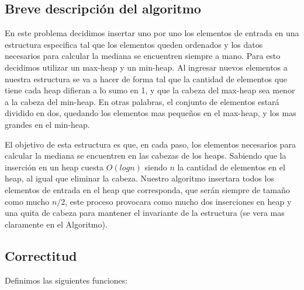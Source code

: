 \documentclass{article}
\theoremstyle{definition}
\theoremstyle{remark}
\begin{document}
\subsection{Breve descripción del algoritmo}
En este problema decidimos insertar uno por uno los elementos de entrada en una estructura especifica tal que los elementos queden ordenados y los datos necesarios para calcular la mediana se encuentren siempre a mano. Para esto decidimos utilizar un max-heap y un min-heap. Al ingresar nuevos elementos a nuestra estructura se va a hacer de forma tal que la cantidad de elementos que tiene cada heap difieran a lo sumo en 1, y que la cabeza del max-heap sea menor a la cabeza del min-heap. En otras palabras, el conjunto de elementos estará dividido en dos, quedando los elementos mas pequeños en el max-heap, y los mas grandes en el min-heap.\par
El objetivo de esta estructura es que, en cada paso, los elementos necesarios para calcular la mediana se encuentren en las cabezas de los heaps. 
Sabiendo que la inserción en un heap cuesta $O(log n)$ siendo $n$ la cantidad de elementos en el heap, al igual que eliminar la cabeza. 
Nuestro algoritmo insertara todos los elementos de entrada en el heap que corresponda, que serán siempre de tamaño como mucho $n/2$, este proceso provocara como mucho dos inserciones en heap y una quita de cabeza para mantener el invariante de la estructura (se vera mas claramente en el Algoritmo).



\subsection{Correctitud}

Definimos las siguientes funciones: \\

\newcommand{\twopartdef}[4]
{
	\left\{
		\begin{array}{ll}
			#1 & \mbox{if } #2 \\
			#3 & \mbox{if } #4 \\
		\end{array}
	\right.
}

\newcommand{\fourpartdef}[8]
{
	\left\{
		\begin{array}{ll}
			#1 & \mbox{if } #2 \\
			#3 & \mbox{if } #4 \\
			#5 & \mbox{if } #6 \\
			#7 & \mbox{if } #8 \\
		\end{array}
	\right.
}
\end{document}
